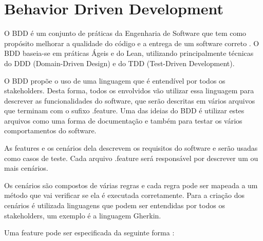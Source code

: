 



\section{Behavior Driven Development}
O BDD é um conjunto de práticas da Engenharia de Software que tem como propósito melhorar a qualidade do código e a entrega de um software correto \cite{bddInAction}. O BDD baseia-se em práticas Ágeis e do Lean, utilizando principalmente técnicas do DDD (Domain-Driven Design) e do TDD (Test-Driven Development).

O BDD propõe o uso de uma linguagem que é entendível por todos os stakeholders. Desta forma, todos os envolvidos vão utilizar essa linguagem para descrever as funcionalidades do software, que serão descritas em vários arquivos que terminam com o sufixo .feature. Uma das ideias do BDD é utilizar estes arquivos como uma forma de documentação e também para testar os vários comportamentos do software.

As features e os cenários dela descrevem os requisitos do software e serão usadas como casos de teste. Cada arquivo .feature será responsável por descrever um ou mais cenários.

Os cenários são compostos de várias regras e cada regra pode ser mapeada a um método que vai verificar se ela é executada corretamente. Para a criação dos cenários é utilizada linguagens que podem ser entendidas por todos os stakeholders, um exemplo é a linguagem Gherkin.

Uma feature pode ser especificada da seguinte forma \cite{BDDthesis}:

